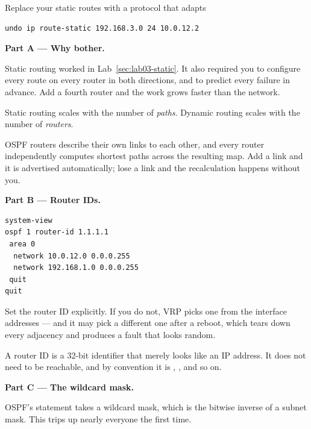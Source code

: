 \begin{labproject}{Replace your static routes with a protocol that adapts}
\begin{labmode}
\begin{lstlisting}[style=utpterminal]
undo ip route-static 192.168.3.0 24 10.0.12.2
\end{lstlisting}
\end{labmode}

\medskip\noindent\textbf{Part A --- Why bother.}\par
Static routing worked in Lab~\ref{sec:lab03-static}. It also required you to configure every route on every router in both directions, and to predict every failure in advance. Add a fourth router and the work grows faster than the network.

\begin{keyidea}
Static routing scales with the number of \emph{paths}. Dynamic routing scales with the number of \emph{routers}.

OSPF routers describe their own links to each other, and every router independently computes shortest paths across the resulting map. Add a link and it is advertised automatically; lose a link and the recalculation happens without you.
\end{keyidea}

\medskip\noindent\textbf{Part B --- Router IDs.}\par

\begin{lstlisting}[style=utpterminal]
system-view
ospf 1 router-id 1.1.1.1
 area 0
  network 10.0.12.0 0.0.0.255
  network 192.168.1.0 0.0.0.255
 quit
quit
\end{lstlisting}

\begin{pitfall}
Set the router ID explicitly. If you do not, VRP picks one from the interface addresses --- and it may pick a different one after a reboot, which tears down every adjacency and produces a fault that looks random.

A router ID is a 32-bit identifier that merely looks like an IP address. It does not need to be reachable, and by convention it is , , and so on.
\end{pitfall}

\medskip\noindent\textbf{Part C --- The wildcard mask.}\par
OSPF's  statement takes a wildcard mask, which is the bitwise inverse of a subnet mask. This trips up nearly everyone the first time.


\end{labproject}
